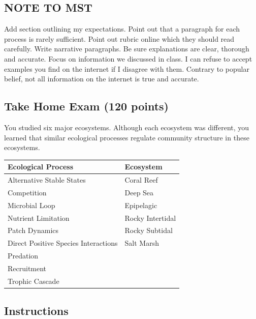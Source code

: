 \documentclass[11pt, addpoints]{exam}
\begin{document}
\subsection*{NOTE TO MST}

Add section outlining my expectations. Point out that a paragraph for each process is rarely sufficient. Point out rubric online which they should read carefully. Write narrative paragraphs. Be sure explanations are clear, thorough and accurate. Focus on information we discussed in class. I can refuse to accept examples you find on the internet if I disagree with them. Contrary to popular belief, not all information on the internet is true and accurate.

\subsection*{Take Home Exam (120 points)}

You studied six major ecosystems. Although each ecosystem was different,
you learned that similar ecological processes regulate community
structure in these ecosystems.

\begin{center}
\begin{tabular}{@{}ll@{}}
\toprule
Ecological Process & Ecosystem\tabularnewline
\midrule
Alternative Stable States & Coral Reef \tabularnewline
Competition & Deep Sea \tabularnewline
Microbial Loop & Epipelagic \tabularnewline
Nutrient Limitation & Rocky Intertidal \tabularnewline
Patch Dynamics & Rocky Subtidal \tabularnewline
Direct Positive Species Interactions & Salt Marsh \tabularnewline
Predation & \tabularnewline
Recruitment & \tabularnewline
Trophic Cascade & \tabularnewline
\bottomrule
\end{tabular}
\end{center}

\subsection*{Instructions}
\end{document}

